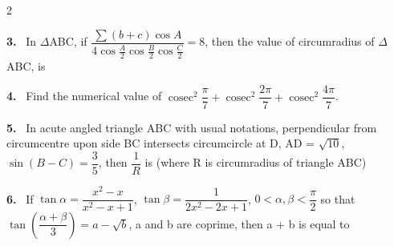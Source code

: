 \documentclass[10pt]{extarticle}
\newcommand{\qn}[1]{\par\smallskip\noindent\textbf{#1.}~}
\begin{document}
\begin{multicols}{2}
\qn{3} In $\Delta$ABC, if $\dfrac{\sum(b+c)\cos A}{4\cos\frac A2\cos\frac B2\cos\frac C2}=8$, then the value of circumradius of $\Delta$ABC, is
\qn{4} Find the numerical value of $\operatorname{cosec}^2\dfrac\pi7+\operatorname{cosec}^2\dfrac{2\pi}7+\operatorname{cosec}^2\dfrac{4\pi}7$.
\qn{5} In acute angled triangle ABC with usual notations, perpendicular from circumcentre upon side BC intersects circumcircle at D, AD = $\sqrt{10}$, $\sin(B-C)=\dfrac35$, then $\dfrac1R$ is (where R is circumradius of triangle ABC)
\qn{6} If $\tan\alpha=\dfrac{x^2-x}{x^2-x+1}$, $\tan\beta=\dfrac{1}{2x^2-2x+1}$, $0<\alpha,\beta<\dfrac\pi2$ so that $\tan\left(\dfrac{\alpha+\beta}3\right)=a-\sqrt b$, a and b are coprime, then a + b is equal to
\end{multicols}
\end{document}
